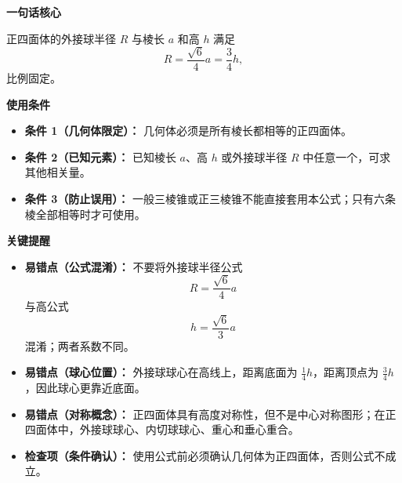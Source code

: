 \begin{summarybox}
	\textbf{\textcolor{CSummary}{一句话核心}}

	正四面体的外接球半径 $R$ 与棱长 $a$ 和高 $h$ 满足
	\[
		R = \frac{\sqrt{6}}{4}a = \frac{3}{4}h,
	\]
	比例固定。

	\medskip
	\textbf{\textcolor{CSummary}{使用条件}}
	\begin{itemize}[leftmargin=*, itemsep=0.5em, topsep=0.4em]
		\item \textbf{条件 1（几何体限定）：} 几何体必须是所有棱长都相等的正四面体。
		\item \textbf{条件 2（已知元素）：} 已知棱长 $a$、高 $h$ 或外接球半径 $R$ 中任意一个，可求其他相关量。
		\item \textbf{条件 3（防止误用）：} 一般三棱锥或正三棱锥不能直接套用本公式；只有六条棱全部相等时才可使用。
	\end{itemize}

	\medskip
	\textbf{\textcolor{CSummary}{关键提醒}}
	\begin{itemize}[leftmargin=*, itemsep=0.5em, topsep=0.4em]
		\item \textbf{易错点（公式混淆）：} 不要将外接球半径公式
		      \[
			      R=\frac{\sqrt{6}}{4}a
		      \]
		      与高公式
		      \[
			      h=\frac{\sqrt{6}}{3}a
		      \]
		      混淆；两者系数不同。
		\item \textbf{易错点（球心位置）：} 外接球球心在高线上，距离底面为 $\frac{1}{4}h$，距离顶点为 $\frac{3}{4}h$，因此球心更靠近底面。
		\item \textbf{易错点（对称概念）：} 正四面体具有高度对称性，但不是中心对称图形；在正四面体中，外接球球心、内切球球心、重心和垂心重合。
		\item \textbf{检查项（条件确认）：} 使用公式前必须确认几何体为正四面体，否则公式不成立。
	\end{itemize}
\end{summarybox}